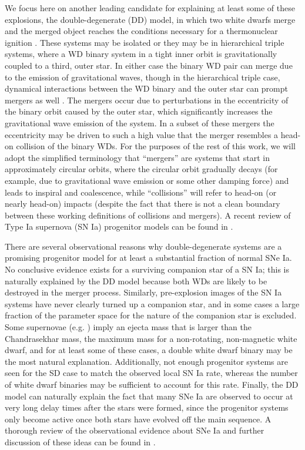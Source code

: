 \documentclass[12pt]{article}
\begin{document}
We focus here
on another leading candidate for explaining at least some of these explosions,
the double-degenerate (DD) model, in which two white dwarfs merge and
the merged object reaches the conditions necessary for a thermonuclear
ignition \citep{ibentutukov:1984,webbink:1984}. These systems
may be isolated or they may be in hierarchical triple systems, where a WD binary
system in a tight inner orbit is gravitationally coupled to a third, outer star.
In either case the binary WD pair can merge due to the emission of gravitational waves,
though in the hierarchical triple case, dynamical interactions between the WD binary and
the outer star can prompt mergers as well \citep{thompson:2011,hamers:2013}. The mergers
occur due to perturbations in the eccentricity of the binary orbit caused by the outer
star, which significantly increases the gravitational wave emission of the system. In a
subset of these mergers the eccentricity may be driven to such a high value that the
merger resembles a head-on collision of the binary WDs. For the purposes of the
rest of this work, we will adopt the simplified terminology that  ``mergers'' are
systems that start in approximately circular orbits, where the circular orbit
gradually decays (for example, due to gravitational wave emission or some other
damping force) and leads to inspiral and coalescence, while ``collisions'' will
refer to head-on (or nearly head-on) impacts (despite the fact that there is not
a clean boundary between these working definitions of collisions and mergers).
A recent review of Type Ia
supernova (SN Ia) progenitor models can be found in \citet{hillebrandt:2013}.

There are several observational reasons why double-degenerate systems
are a promising progenitor model for at least a substantial fraction
of normal SNe Ia. No conclusive evidence exists for a surviving
companion star of a SN Ia; this is naturally explained by the DD model
because both WDs are likely to be destroyed in the merger
process. Similarly, pre-explosion images of the SN Ia systems have
never clearly turned up a companion star, and in some cases a large
fraction of the parameter space for the nature of the companion star
is excluded. Some supernovae (e.g. \citealt{howell:2006}) imply an ejecta mass
that is larger than the Chandrasekhar mass, the maximum mass for a non-rotating,
non-magnetic white dwarf, and for at least some of these cases, a double white
dwarf binary may be the most natural explanation.
Additionally, not enough progenitor systems are seen for
the SD case to match the observed local SN Ia rate, whereas the number
of white dwarf binaries may be sufficient to account for this
rate. Finally, the DD model can naturally explain the fact that many
SNe Ia are observed to occur at very long delay times after the stars
were formed, since the progenitor systems only become active once both
stars have evolved off the main sequence. A thorough review of the
observational evidence about SNe Ia and further discussion of these
ideas can be found in \cite{maoz:2014}.
\end{document}
